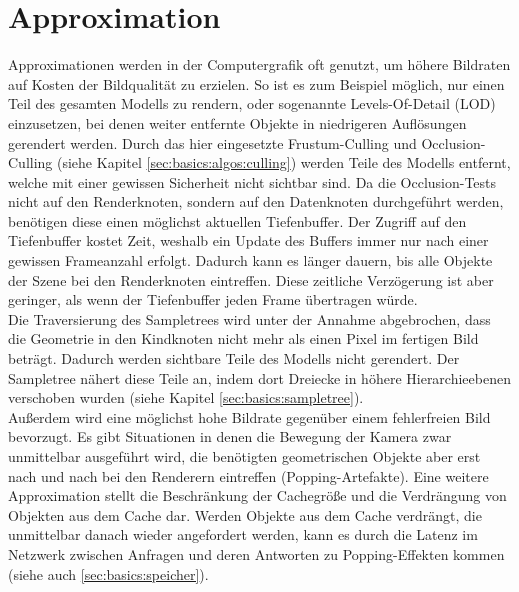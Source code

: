 \section{Approximation}
\label{sec:basics:approximation}
Approximationen werden in der Computergrafik oft genutzt, um höhere Bildraten auf Kosten der Bildqualität zu erzielen. So ist es zum Beispiel möglich, nur einen Teil des gesamten Modells zu rendern, oder sogenannte Levels-Of-Detail (LOD) einzusetzen, bei denen weiter entfernte Objekte in niedrigeren Auflösungen gerendert werden. Durch das hier eingesetzte Frustum-Culling und Occlusion-Culling (siehe Kapitel \ref{sec:basics:algos:culling}) werden Teile des Modells entfernt, welche mit einer gewissen Sicherheit nicht sichtbar sind. 
Da die Occlusion-Tests nicht auf den Renderknoten, sondern auf den Datenknoten durchgeführt werden, benötigen diese einen möglichst aktuellen Tiefenbuffer. Der Zugriff auf den Tiefenbuffer kostet Zeit, weshalb ein Update des Buffers immer nur nach einer gewissen Frameanzahl erfolgt. Dadurch kann es länger dauern, bis alle Objekte der Szene bei den Renderknoten eintreffen. Diese zeitliche Verzögerung ist aber geringer, als wenn der Tiefenbuffer jeden Frame übertragen würde.\\
Die Traversierung des Sampletrees wird unter der Annahme abgebrochen, dass die Geometrie in den Kindknoten nicht mehr als einen Pixel im fertigen Bild beträgt. Dadurch werden sichtbare Teile des Modells nicht gerendert. Der Sampletree nähert diese Teile an, indem dort Dreiecke in höhere Hierarchieebenen verschoben wurden (siehe Kapitel \ref{sec:basics:sampletree}).\\
Außerdem wird eine möglichst hohe Bildrate gegenüber einem fehlerfreien Bild bevorzugt. Es gibt Situationen in denen die Bewegung der Kamera zwar unmittelbar ausgeführt wird, die benötigten geometrischen Objekte aber erst nach und nach bei den Renderern eintreffen (Popping-Artefakte). Eine weitere Approximation stellt die Beschränkung der Cachegröße und die Verdrängung von Objekten aus dem Cache dar. Werden Objekte aus dem Cache verdrängt, die unmittelbar danach wieder angefordert werden, kann es durch die Latenz im Netzwerk zwischen Anfragen und deren Antworten zu Popping-Effekten kommen (siehe auch \ref{sec:basics:speicher}). 
